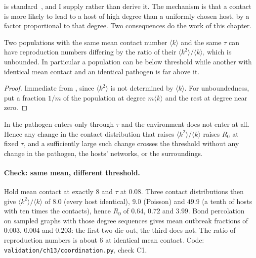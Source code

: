  is standard~\citep{anderson1991infectious,diekmann1990host},
and I supply rather than derive it. The mechanism is that a contact is more
likely to lead to a host of high degree than a uniformly chosen host, by a
factor proportional to that degree. Two consequences do the work of this chapter.

\begin{corollary}
\label{sm:cor-mean}
\lnkD{} Two populations with the same mean contact number
$\langle k\rangle$ and the same $\tau$ can have reproduction numbers
differing by the ratio of their $\langle k^2\rangle/\langle k\rangle$, which
is unbounded. In particular a population can be below threshold while
another with identical mean contact and an identical pathogen is far above
it.
\end{corollary}

\begin{proof}
Immediate from , since $\langle k^2\rangle$ is not determined
by $\langle k\rangle$. For unboundedness, put a fraction $1/m$ of the
population at degree $m\langle k\rangle$ and the rest at degree near zero.
\end{proof}

\begin{corollary}
\label{sm:cor-structure}
\lnkD{} In  the pathogen enters only through $\tau$ and the
environment does not enter at all. Hence any change in the contact
distribution that raises $\langle k^2\rangle/\langle k\rangle$ raises $R_0$
at fixed $\tau$, and a sufficiently large such change crosses the threshold
without any change in the pathogen, the hosts' networks, or the
surroundings.
\end{corollary}

\paragraph{Check: same mean, different threshold.} \lnkC{} Hold mean contact at
exactly $8$ and $\tau$ at $0.08$. Three contact distributions then give
$\langle k^2\rangle/\langle k\rangle$ of $8.0$ (every host identical),
$9.0$ (Poisson) and $49.9$ (a tenth of hosts with ten times the contacts),
hence $R_0$ of $0.64$, $0.72$ and $3.99$. Bond percolation on sampled
graphs with those degree sequences gives mean outbreak fractions of
$0.003$, $0.004$ and $0.203$: the first two die out, the third does not.
The ratio of reproduction numbers is about $6$ at identical mean contact.
Code: \texttt{validation/ch13/coordination.py}, check C1.

